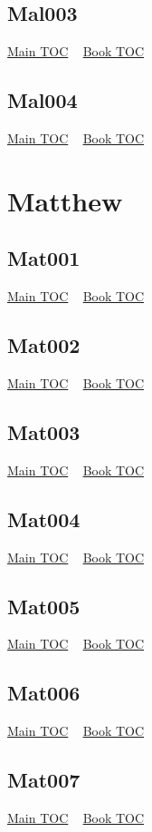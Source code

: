 \documentclass{book}
\begin{document}
  \section{Mal003}\hyperlink{toc}{Main TOC} ~ \hyperref[subsec:Mal]{Book TOC} 
  \section{Mal004}\hyperlink{toc}{Main TOC} ~ \hyperref[subsec:Mal]{Book TOC} 
  \chapter{Matthew} \label{subsec:Mat} \begin{multicols}{2} \minitoc \end{multicols}
  \section{Mat001}\hyperlink{toc}{Main TOC} ~ \hyperref[subsec:Mat]{Book TOC} 
  \section{Mat002}\hyperlink{toc}{Main TOC} ~ \hyperref[subsec:Mat]{Book TOC} 
  \section{Mat003}\hyperlink{toc}{Main TOC} ~ \hyperref[subsec:Mat]{Book TOC} 
  \section{Mat004}\hyperlink{toc}{Main TOC} ~ \hyperref[subsec:Mat]{Book TOC} 
  \section{Mat005}\hyperlink{toc}{Main TOC} ~ \hyperref[subsec:Mat]{Book TOC} 
  \section{Mat006}\hyperlink{toc}{Main TOC} ~ \hyperref[subsec:Mat]{Book TOC} 
  \section{Mat007}\hyperlink{toc}{Main TOC} ~ \hyperref[subsec:Mat]{Book TOC} 
\end{document}
